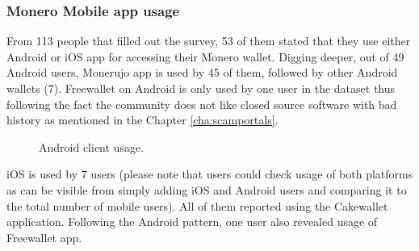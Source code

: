 \documentclass[
  printed, %
  table,   %
  lof,     %
  lot,     %
           oneside, color
]{fithesis3}
\begin{document}
\subsubsection{Monero Mobile app usage}
From 113 people that filled out the survey, 53 of them stated that they use either Android or iOS app for accessing their Monero wallet. Digging deeper, out of 49 Android users, Monerujo app is used by 45 of them, followed by other Android wallets (7). Freewallet on Android is only used by one user in the dataset thus following the fact the community does not like closed source software with bad history as mentioned in the Chapter \ref{cha:scamportals}. 
\vspace{-2.5em}
\begin{center}
\begin{figure}[H]
\caption{Android client usage.}
\label{chart:price}\end{figure}\end{center}

iOS is used by 7 users (please note that users could check usage of both platforms as can be visible from simply adding iOS and Android users and comparing it to the total number of mobile users). All of them reported using the Cakewallet application. Following the Android pattern, one user also revealed usage of Freewallet app.
\end{document}
